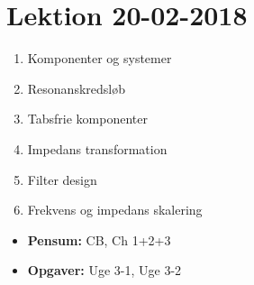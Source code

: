 \section{Lektion 20-02-2018}

\begin{enumerate}
	\item Komponenter og systemer
	\item Resonanskredsløb
	\item Tabsfrie komponenter
	\item Impedans transformation
	\item Filter design
	\item Frekvens og impedans skalering
\end{enumerate}

\begin{mdframed}[style=exampledefault]
	\begin{itemize}
		\item \textbf{Pensum:} CB, Ch 1+2+3
		\item \textbf{Opgaver:} Uge 3-1, Uge 3-2
	\end{itemize}
\end{mdframed}

